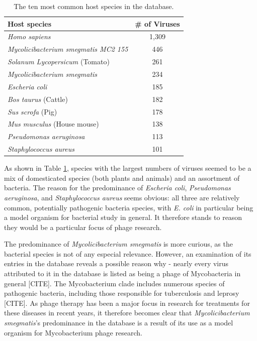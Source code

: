 \documentclass[12pt]{article}
\begin{document}
    \begin{table}[H]
        \begin{center}
        \begin{tabular}{|l||c|}
        \hline
        Host species                                 & \# of Viruses \\ \hline\hline
        \textit{Homo sapiens}                        & 1,309         \\ \hline
        \textit{Mycolicibacterium smegmatis MC2 155} & 446           \\ \hline
        \textit{Solanum Lycopersicum} (Tomato)       & 261           \\ \hline
        \textit{Mycolicibacterium smegmatis}         & 234           \\ \hline
        \textit{Escheria coli}                       & 185           \\ \hline
        \textit{Bos taurus} (Cattle)                 & 182           \\ \hline
        \textit{Sus scrofa} (Pig)                    & 178           \\ \hline
        \textit{Mus musculus} (House mouse)          & 138           \\ \hline
        \textit{Pseudomonas aeruginosa}              & 113           \\ \hline
        \textit{Staphylococcus aureus}               & 101           \\ \hline    
        \end{tabular}
        \caption{The ten most common host species in the database.}
        \label{most_common_hosts_table}
        \end{center}
    \end{table}

    As shown in Table \ref{most_common_hosts_table}, species with the largest
    numbers of viruses seemed to be a mix of domesticated species (both plants
    and animals) and an assortment of bacteria. The reason for the predominance of
    \emph{Escheria coli}, \emph{Pseudomonas aeruginosa}, and \emph{Staphylococcus
    aureus} seems obvious: all three are relatively common, potentially pathogenic
    bacteria species, with \emph{E. coli} in particular being a model organism for
    bacterial study in general. It therefore stands to reason they would be a
    particular focus of phage research.

    The predominance of \emph{Mycolicibacterium smegmatis} is more curious, as the
    bacterial species is not of any especial relevance. However, an examination of 
    its entries in the database reveals a possible reason why - nearly every virus
    attributed to it in the database is listed as being a phage of Mycobacteria in
    general [CITE]. The Mycobacterium clade includes numerous species of pathogenic
    bacteria, including those responsible for tuberculosis and leprosy [CITE]. As 
    phage therapy has been a major focus in research for treatments for these
    diseases in recent years, it therefore becomes clear that
    \emph{Mycolicibacterium smegmatis}'s predominance in the database is a result
    of its use as a model organism for Mycobacterium phage research.
    
\end{document}
